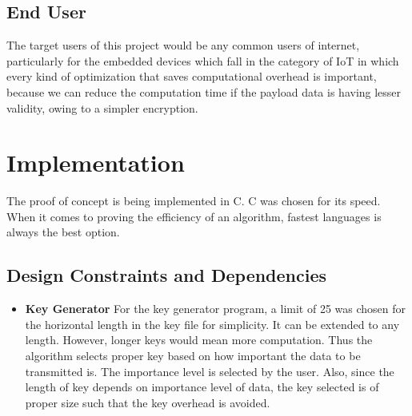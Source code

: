 \subsection{End User}

The target users of this project would be any common users of internet, particularly for
the embedded devices which fall in the category of IoT in which every kind of optimization
that saves computational overhead is important, because we can reduce the computation
time if the payload data is having lesser validity, owing to a simpler encryption.

\section{Implementation}

The proof of concept is being implemented in C. C was chosen for its speed. When it
comes to proving the efficiency of an algorithm, fastest languages is always the best
option.

\subsection{Design Constraints and Dependencies}


\begin{itemize}
  \item {\bf Key Generator} For the key generator program, a limit of 25 was chosen for the horizontal
length in the key file for simplicity. It can be extended to any length. However, longer keys
would mean more computation. Thus the algorithm selects proper key based on how
important the data to be transmitted is. The importance level is selected by the user. Also,
since the length of key depends on importance level of data, the key selected is of proper
size such that the key overhead is avoided.
  
\end{itemize}




\newpage


